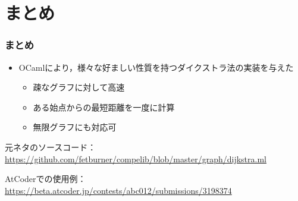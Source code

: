 \documentclass[dvipdfmx,cjk,xcolor=dvipsnames,envcountsect,notheorems,12pt]{beamer}
\theoremstyle{definition}
\begin{document}
\section*{まとめ}

\begin{frame}
	\vspace{-7mm}
	\frametitle{まとめ}
	\begin{itemize}
		\item OCamlにより，様々な好ましい性質を持つダイクストラ法の実装を与えた
			\begin{itemize}
				\item 疎なグラフに対して高速
				\item ある始点からの最短距離を一度に計算
				\item 無限グラフにも対応可
			\end{itemize}
	\end{itemize}

	\vfill

	{\large 元ネタのソースコード：}
	\url{https://github.com/fetburner/compelib/blob/master/graph/dijkstra.ml}
	
	\vfill

	{\large AtCoderでの使用例：}
	\url{https://beta.atcoder.jp/contests/abc012/submissions/3198374}
\end{frame}
\end{document}
